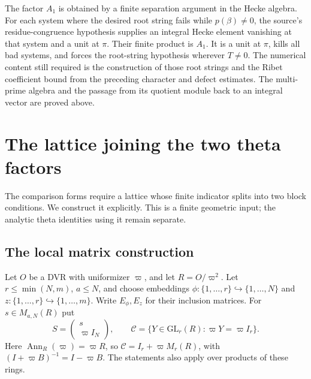 \documentclass[11pt,a4paper]{article}
\theoremstyle{definition}
\begin{document}
The factor \(A_1\) is obtained by a finite
separation argument in the Hecke algebra.
For each system where the desired root string
fails while \(p(\beta)\ne0\), the source's
residue-congruence hypothesis supplies an
integral Hecke element vanishing at that
system and a unit at \(\pi\).
Their finite product is \(A_1\).
It is a unit at \(\pi\), kills all bad
systems, and forces the root-string
hypothesis wherever \(T\ne0\).
The numerical content still required is the
construction of those root strings and the
Ribet coefficient bound from the preceding
character and defect estimates.
The multi-prime algebra and the passage
from its quotient module back to an
integral vector are proved above.

\section{The lattice joining the two theta factors}
\label{sec:glued-lattice}
The comparison forms require a lattice whose finite
indicator splits into two block conditions.
We construct it explicitly. This is a finite
geometric input; the analytic theta identities
using it remain separate.

\subsection{The local matrix construction}
Let \(O\) be a DVR with uniformizer \(\varpi\),
and let \(R=O/\varpi^2\).
Let \(r\le\min(N,m)\), \(a\le N\), and choose embeddings
\(\phi:\{1,\ldots,r\}\hookrightarrow\{1,\ldots,N\}\)
and \(z:\{1,\ldots,r\}\hookrightarrow\{1,\ldots,m\}\).
Write \(E_\phi,E_z\) for their inclusion matrices.
For \(s\in M_{a,N}(R)\) put
\[
 S=\begin{pmatrix}s\\ \varpi I_N\end{pmatrix},\qquad
 \mathcal C=\{Y\in\mathrm{GL}_r(R):\varpi Y=\varpi I_r\}.
\]
Here \(\operatorname{Ann}_R(\varpi)=\varpi R\), so
\(\mathcal C=I_r+\varpi M_r(R)\), with
\((I+\varpi B)^{-1}=I-\varpi B\).
The statements also apply over products of these rings.
\end{document}
